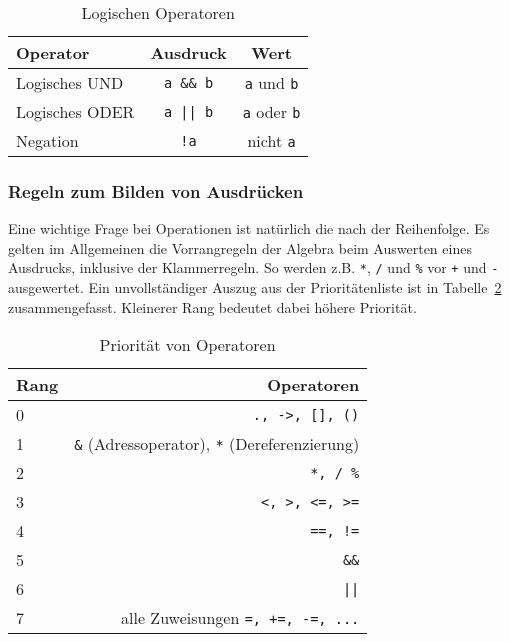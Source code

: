 \begin{table}
  \centering
  \begin{tabular}{l c c}
    \hline
    Operator & Ausdruck & Wert \\
    \hline
    Logisches UND & \verb|a && b|  &   \verb|a| und \verb|b| \\

    Logisches ODER & \verb'a || b'  &   \verb|a| oder \verb|b| \\

    Negation      & \verb|!a|      &   nicht \verb|a| \\
    \hline
  \end{tabular}
  \caption{Logischen Operatoren \label{vergoper2}}
\end{table}

\subsubsection{Regeln zum Bilden von Ausdrücken}

Eine wichtige Frage bei Operationen ist natürlich die nach der Reihenfolge.
Es gelten im Allgemeinen die Vorrangregeln der Algebra beim Auswerten eines Ausdrucks, inklusive der Klammerregeln.
So werden z.B. \verb|*|, \verb|/| und \verb|%| vor \verb|+| und \verb|-| ausgewertet.
Ein unvollständiger Auszug aus der Prioritätenliste ist in Tabelle~\ref{tab:prior} zusammengefasst.
Kleinerer Rang bedeutet dabei höhere Priorität.

\begin{table}
  \centering
  \begin{tabular}{l r}
    \hline
    Rang & Operatoren \\
    \hline
    0 & \texttt{., ->, [], ()}\\
    1 & \texttt{\&} (Adressoperator), \texttt{*} (Dereferenzierung)\\
    2 & \texttt{*, / \%}\\
    3 & \texttt{<, >, <=, >=}\\
    4 & \texttt{==, !=}\\
    5 & \texttt{\&\&}\\
    6 & \texttt{||}\\
    7 & alle Zuweisungen \texttt{=, +=, -=, ...}\\
    \hline
  \end{tabular}
  \caption{Priorität von Operatoren}
  \label{tab:prior}
\end{table}
